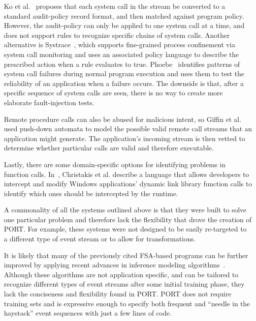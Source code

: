 Ko et al.~\cite{DBLP:conf/acsac/KoFL94} 
proposes that each system call in the
stream be converted to a standard audit-policy record format, and then
matched against program policy.
However, the audit-policy can only be applied to
one system call at a time,
and does not support rules to recognize specific chains of system calls.
Another alternative is
Systrace~\cite{DBLP:conf/uss/Provos03},
which
supports fine-grained process confinement
via system call monitoring and uses an associated policy language 
to describe the prescribed action when a rule evaluates to true.
Phoebe~\cite{DBLP:journals/corr/abs-2006-04444}
identifies patterns of system call failures during normal program execution
and uses them
to test the reliability of an application when a failure occurs.
The downside is that, after a specific sequence of system calls are seen, there is no way to create more elaborate fault-injection
tests.

Remote procedure calls can also be abused for malicious
intent,
so Giffin et al. ~\cite{DBLP:conf/uss/GiffinJM02} used
push-down automata to model the possible valid
remote call streams that an application might generate.
The application's incoming stream 
is then vetted
to determine whether particular calls are valid and therefore executable.

Lastly, there are some domain-specific options for
identifying problems
in function calls.
In~\cite{DBLP:conf/icse/ChristakisEG017}, Christakis et al. describe a language that allows developers to intercept and modify
Windows applications’ dynamic link library function calls to identify which ones should be
intercepted by the runtime.

A commonality
of all the systems
outlined above
is that they were built to solve one particular problem
and
therefore lack the flexibility that drove the creation of PORT.
For example, these systems were not designed to be easily re-targeted
to a different type of event stream or to allow for transformations.

It is likely that many of the previously cited FSA-based programs can be further improved by applying recent advances in inference modeling algorithms~\cite{MarianiPS17,WalkinshawTD13,EmamM18,BeschastnikhBEK14}. Although these algorithms are not application specific, and can be tailored to recognize different types of event streams after some initial training phase, they lack the conciseness and flexibility found in PORT. PORT does not require training sets and is expressive enough to specify both frequent and  “needle in the haystack” event sequences with just a few lines of code.


